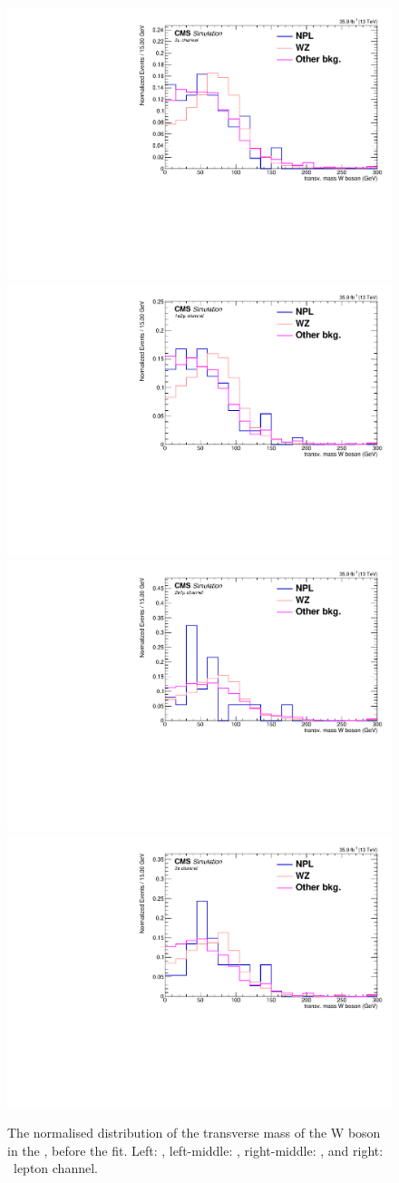 \begin{figure}[htbp]
	\centering
	\includegraphics[width=0.49\linewidth]{6_Search/Figures/MTWnormalised/MTW_uuu_Normalized}
	\includegraphics[width=0.49\linewidth]{6_Search/Figures/MTWnormalised/MTW_uue_Normalized}
	\includegraphics[width=0.49\linewidth]{6_Search/Figures/MTWnormalised/MTW_eeu_Normalized}
	\includegraphics[width=0.49\linewidth]{6_Search/Figures/MTWnormalised/MTW_eee_Normalized}
	\caption{The normalised distribution of the transverse mass of the W boson in the \WZCR, before the fit. Left: \mumumu, left-middle: \emumu, right-middle: \eemu, and right: \eee\ lepton channel.  }
	\label{fig:mtwnorm}
\end{figure}

